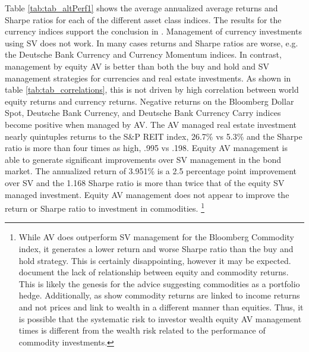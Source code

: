 Table \ref{tab:tab_altPerf1} shows the average annualized average returns and Sharpe ratios for each of the different asset class indices. The results for the currency indices support the conclusion in \citet{moreira_volatility-managed_2017}. Management of currency investments using SV does not work. In many cases returns and Sharpe ratios are worse, e.g. the Deutsche Bank Currency and Currency Momentum indices. In contrast, management by equity AV is better than both the buy and hold and SV management strategies for currencies and real estate investments. As shown in table \ref{tab:tab_correlations}, this is not driven by high correlation between world equity returns and currency returns. Negative returns on the Bloomberg Dollar Spot, Deutsche Bank Currency, and Deutsche Bank Currency Carry indices become positive when managed by AV. The AV managed real estate investment nearly quintuples returns to the S\&P REIT index, 26.7\% vs 5.3\% and the Sharpe ratio is more than four times as high, .995 vs .198. Equity AV management is able to generate significant improvements over SV management in the bond market. The annualized return of 3.951\% is a 2.5 percentage point improvement over SV and the 1.168 Sharpe ratio is more than twice that of the equity SV managed investment. Equity AV management does not appear to improve the return or Sharpe ratio to investment in commodities. \footnote{While AV does outperform SV management for the Bloomberg Commodity index, it generates a lower return and worse Sharpe ratio than the buy and hold strategy. This is certainly disappointing, however it may be expected. \citet{gorton_facts_2006,buyuksahin_commodities_2008,NBERw21243} document the lack of relationship between equity and commodity returns. This is likely the genesis for the advice suggesting commodities as a portfolio hedge. Additionally, as \citet{erb_conquering_nodate} show commodity returns are linked to income returns and not prices and link to wealth in a different manner than equities. Thus, it is possible that the systematic risk to investor wealth equity AV management times is different from the wealth risk related to the performance of commodity investments.}


